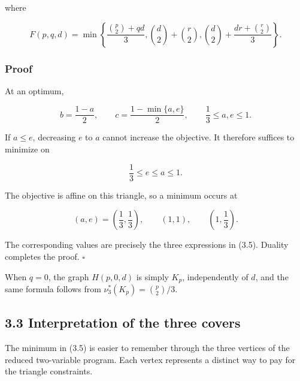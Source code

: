 \documentclass[
  11pt,
]{article}
\begin{document}
where

\[
\boxed{
F(p,q,d)
=
\min\left\{
\frac{\binom p2+qd}{3},
\binom d2+\binom r2,
\binom d2+\frac{dr+\binom r2}{3}
\right\}.
}
\tag{3.5}
\]

\subsubsection{Proof}\label{proof}

At an optimum,

\[
b=\frac{1-a}{2},
\qquad
c=\frac{1-\min\{a,e\}}2,
\qquad
\frac13\le a,e\le1.
\]

If \(a\le e\), decreasing \(e\) to \(a\) cannot increase the objective. It therefore suffices to minimize on

\[
\frac13\le e\le a\le1.
\]

The objective is affine on this triangle, so a minimum occurs at

\[
(a,e)=\left(\frac13,\frac13\right),
\qquad
(1,1),
\qquad
\left(1,\frac13\right).
\]

The corresponding values are precisely the three expressions in (3.5). Duality completes the proof. \(\square\)

When \(q=0\), the graph \(H(p,0,d)\) is simply \(K_p\), independently of \(d\), and the same formula follows from \(\nu_3^*(K_p)=\binom p2/3\).

\subsection{3.3 Interpretation of the three covers}\label{interpretation-of-the-three-covers}

The minimum in (3.5) is easier to remember through the three vertices of the reduced two-variable program. Each vertex represents a distinct way to pay for the triangle constraints.
\end{document}
